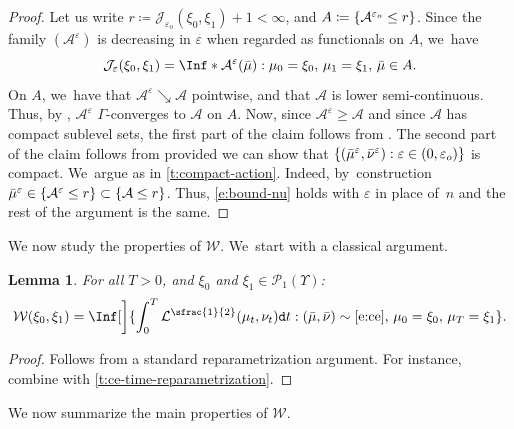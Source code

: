 \documentclass[JEP,XML,SOM,Unicode,published]{cedram}
\newtheorem{lemma}[theorem]{Lemma}
\theoremstyle{definition}
\theoremstyle{remark}
\DeclarePairedDelimiter{\set}{\lbrace}{\rbrace}
\begin{document}
\begin{proof}
Let us write $r \coloneq \mathcal{J}_{\varepsilon_{o}}(\xi_{0}, \xi_{1}) + 1 < \infty$, and $A \coloneq \set{ \mathcal{A}^{\varepsilon_{o}} \leq r }$.
Since the family $( \mathcal{A}^{\varepsilon} )$ is decreasing in $\varepsilon$ when regarded as functionals on $A$, we~have
\begin{equation*}
\mathcal{J}_{\varepsilon}(\xi_{0}, \xi_{1}) = \Inf*{ \mathcal{A}^{\varepsilon}(\bar{\mu}) : \mu_{0} = \xi_{0},\, \mu_{1} = \xi_{1},\, \bar{\mu} \in A }.
\end{equation*}
On $A$, we~have that $\mathcal{A}^{\varepsilon} \searrow \mathcal{A}$ pointwise, and that $\mathcal{A}$ is lower semi-continuous.
Thus, by \cite[Prop.\,5.7]{DalMaso}, $\mathcal{A}^{\varepsilon}$ $\Gamma$-converges to $\mathcal{A}$ on $A$.
Now, since $\mathcal{A}^{\varepsilon} \geq \mathcal{A}$ and since $\mathcal{A}$ has compact sublevel sets, the first part of the claim follows from \cite[Prop.\,7.7 \& Th.\,7.8]{DalMaso}.
The second part of the claim follows from \cite[Cor.\,7.20]{DalMaso} provided we can show that $\set{ (\bar{\mu}^{\varepsilon}, \bar{\nu}^{\varepsilon}) : \varepsilon \in (0, \varepsilon_{o}) }$ is compact. We~argue as in \cref{t:compact-action}.
Indeed, by~construction $\bar{\mu}^{\varepsilon} \in \set{ \mathcal{A}^{\varepsilon} \leq r } \subset \set{ \mathcal{A} \leq r }$.
Thus, \cref{e:bound-nu} holds with $\varepsilon$ in place of~$n$ and the rest of the argument is the same.
\end{proof}

We now study the properties of $\mathcal{W}$. We~start with a classical argument.
\begin{lemma}\label{t:wcurl-time-reparametrization}
For all $T > 0$, and $\xi_{0}$ and $\xi_{1} \in \mathscr{P}_{1}(\varUpsilon)$:
\begin{equation*}
\mathcal{W}(\xi_{0}, \xi_{1}) = \Inf[\bigg]{ \int_{0}^{T} \mathcal{L}^{\sfrac{1}{2}}(\mu_{t}, \nu_{t}) \mathtt{d} t : (\bar{\mu}, \bar{\nu}) \sim \cref{e:ce},\, \mu_{0} = \xi_{0},\, \mu_{T} = \xi_{1} }.
\end{equation*}
\end{lemma}
\begin{proof}
Follows from a standard reparametrization argument.
For instance, combine \cite[Th.\,5.4]{DNS09} with \cref{t:ce-time-reparametrization}.
\end{proof}

We now summarize the main properties of $\mathcal{W}$.
\skpt
\end{document}
